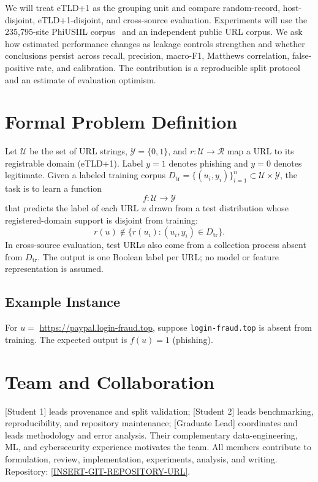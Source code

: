 \documentclass[sigconf,nonacm]{acmart}
\begin{document}
We will treat eTLD+1 as the grouping unit and compare random-record, host-disjoint, eTLD+1-disjoint, and cross-source evaluation. Experiments will use the 235,795-site PhiUSIIL corpus~\cite{prasad2024} and an independent public URL corpus. We ask how estimated performance changes as leakage controls strengthen and whether conclusions persist across recall, precision, macro-F1, Matthews correlation, false-positive rate, and calibration. The contribution is a reproducible split protocol and an estimate of evaluation optimism.

\section{Formal Problem Definition}
Let $\mathcal{U}$ be the set of URL strings, $\mathcal{Y}=\{0,1\}$, and $r:\mathcal{U}\rightarrow\mathcal{R}$ map a URL to its registrable domain (eTLD+1). Label $y=1$ denotes phishing and $y=0$ denotes legitimate. Given a labeled training corpus
$D_{\mathrm{tr}}=\{(u_i,y_i)\}_{i=1}^{n}\subset\mathcal{U}\times\mathcal{Y}$,
the task is to learn a function
\[
 f:\mathcal{U}\rightarrow\mathcal{Y}
\]
that predicts the label of each URL $u$ drawn from a test distribution whose registered-domain support is disjoint from training:
\[
 r(u)\notin\{r(u_i):(u_i,y_i)\in D_{\mathrm{tr}}\}.
\]
In cross-source evaluation, test URLs also come from a collection process absent from $D_{\mathrm{tr}}$. The output is one Boolean label per URL; no model or feature representation is assumed.

\subsection{Example Instance}
For $u=$ \url{https://paypal.login-fraud.top}, suppose \texttt{login-fraud.top} is absent from training. The expected output is $f(u)=1$ (phishing).

\section{Team and Collaboration}
[Student 1] leads provenance and split validation; [Student 2] leads benchmarking, reproducibility, and repository maintenance; [Graduate Lead] coordinates and leads methodology and error analysis. Their complementary data-engineering, ML, and cybersecurity experience motivates the team. All members contribute to formulation, review, implementation, experiments, analysis, and writing. Repository: \url{[INSERT-GIT-REPOSITORY-URL]}.



\end{document}
